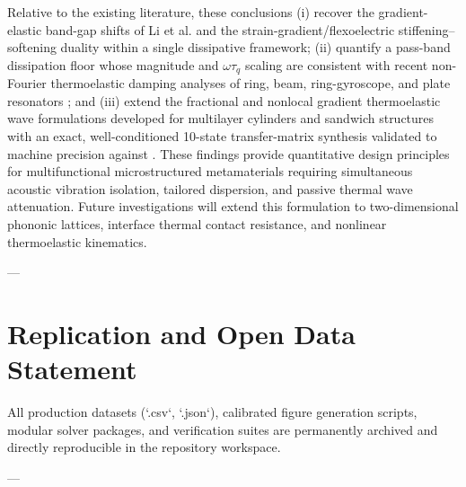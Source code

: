 \documentclass[11pt,a4paper]{article}
\begin{document}
Relative to the existing literature, these conclusions (i) recover the gradient-elastic band-gap shifts of Li et al. \cite{li2016band} and the strain-gradient/flexoelectric stiffening--softening duality \cite{hosseini2024strain, li2024flexoelectric} within a single dissipative framework; (ii) quantify a pass-band dissipation floor whose magnitude and $\omega\tau_q$ scaling are consistent with recent non-Fourier thermoelastic damping analyses of ring, beam, ring-gyroscope, and plate resonators \cite{zhou2024generalized, ge2024theoretical, zhou2025comprehensive, shao2026singlephaselag, garleanu2025nonlocal, zhuang2026thermoelastic, kareem2025thermoelastic}; and (iii) extend the fractional and nonlocal gradient thermoelastic wave formulations developed for multilayer cylinders and sandwich structures \cite{li2026thermoelastic, li2026spectral, youssef2024nonlinear, zhang2026investigation} with an exact, well-conditioned 10-state transfer-matrix synthesis validated to machine precision against \cite{papargyribeskou2009wave}.
These findings provide quantitative design principles for multifunctional microstructured metamaterials requiring simultaneous acoustic vibration isolation, tailored dispersion, and passive thermal wave attenuation. Future investigations will extend this formulation to two-dimensional phononic lattices, interface thermal contact resistance, and nonlinear thermoelastic kinematics.

---

\section*{Replication and Open Data Statement}
All production datasets (`.csv`, `.json`), calibrated figure generation scripts, modular solver packages, and verification suites are permanently archived and directly reproducible in the repository workspace.

---



\end{document}
